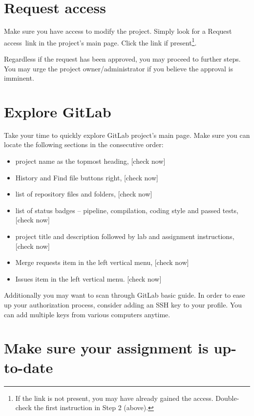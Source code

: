 \section{Request access}\label{sec:reqacc}

{Make sure you have access to modify the project. Simply look for a }{Request access}{~link in the project's main page. Click the link if present\footnote{If the link is not present, you may have already gained the access. Double-check the first instruction in Step 2 (above).}.}

{Regardless if the request has been approved, you may proceed to further steps. You may urge the project owner/administrator if you believe the approval is imminent.}

\section{Explore GitLab}\label{sec:explgl}

{Take your time to quickly explore GitLab project's main page. Make sure you can locate the following sections in the consecutive order:}

\begin{itemize}
\item
  {project name as the topmost heading, {[}check now{]}}
\item
  {History and Find file buttons right, {[}check now{]}}
\item
  {list of repository files and folders, {[}check now{]}}
\item
  {list of status badges -- pipeline, compilation, coding style and passed tests, {[}check now{]}}
\item
  {project title and description followed by lab and assignment instructions, {[}check now{]}}
\item
  {Merge requests item in the left vertical menu, {[}check now{]}}
\item
  {Issues item in the left vertical menu. {[}check now{]}}
\end{itemize}

{Additionally you may want to scan through GitLab basic guide. In order to ease up your authorization process, consider adding an SSH key to your profile. You can add multiple keys from various computers anytime.}

\section{Make sure your assignment is up-to-date}\label{sec:makesure}

